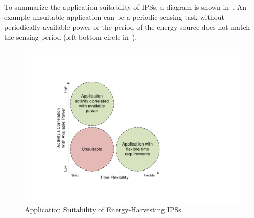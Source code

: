 To summarize the application suitability of IPSs, a diagram is shown in~. 
An example unsuitable application can be a periodic sensing task without periodically available power or the period of the energy source does not match the sensing period (left bottom circle in~).

\begin{figure}[!htb]
  \centering
  \includegraphics[width=0.7\columnwidth]{figure/intro/appsuit2}
  \caption{Application Suitability of Energy-Harvesting IPSs.}
  \label{Figure:appsuit}
\end{figure}



